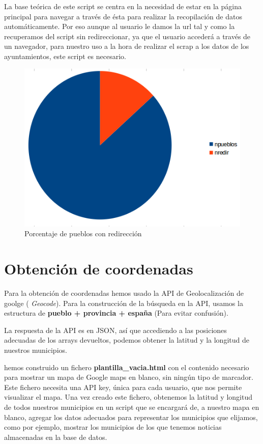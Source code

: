 La base teórica de este script se centra en la necesidad de estar en la página principal para navegar a través de ésta para realizar la recopilación de datos automáticamente.
Por eso aunque al usuario le damos la url tal y como la recuperamos del script sin redireccionar, ya que el usuario accederá a través de un navegador, para nuestro uso a la hora de realizar el scrap a los datos de los ayuntamientos, este script es necesario.
\begin{figure}
\centering
\includegraphics[scale=0.5]{./obdat/imagenes/redir.png}
\caption{Porcentaje de pueblos con redirección}
\label{redireccion}
\end{figure}

\section{Obtención de coordenadas}

Para la obtención de coordenadas hemos usado la API de Geolocalización de goolge ( \textit{Geocode}). Para la construcción de la búsqueda en la API, usamos la estructura de \textbf{pueblo + provincia + españa} (Para evitar confusión).

La respuesta de la API es en JSON, así que accediendo a las posiciones adecuadas de los arrays devueltos, podemos obtener la latitud y la longitud de nuestros municipios.

hemos construido un fichero \textbf{plantilla\_vacia.html} con el contenido necesario para mostrar un mapa de Google maps en blanco, sin ningún tipo de marcador. Este fichero necesita una API key, única para cada usuario, que nos permite visualizar el mapa. Una vez creado este fichero, obtenemos la latitud y longitud de todos nuestros municipios en un script que se encargará de, a nuestro mapa en blanco, agregar los datos adecuados para representar los municipios que elijamos, como por ejemplo, mostrar los municipios de los que tenemos noticias almacenadas en la base de datos.

